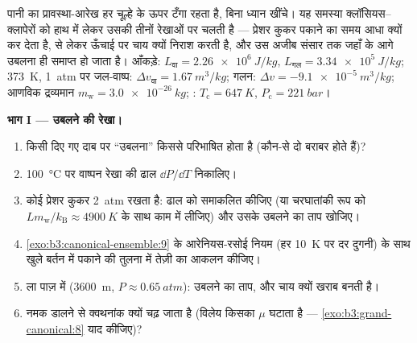 \begin{problem}\label{pb:b3:phase-transitions:1}
पानी का प्रावस्था-आरेख हर चूल्हे के ऊपर टँगा रहता है, बिना ध्यान
खींचे। यह समस्या क्लॉसियस--क्लापेरों को हाथ में लेकर उसकी तीनों
रेखाओं पर चलती है --- प्रेशर कुकर पकाने का समय आधा क्यों कर देता है,
से लेकर ऊँचाई पर चाय क्यों निराश करती है, और उस अजीब संसार तक जहाँ
 के आगे उबलना ही समाप्त हो जाता है। आँकड़े: $L_{\text{वा}}
= \qty{2.26e6}{J/kg}$, $L_{\text{गल}} = \qty{3.34e5}{J/kg}$;
\qty{373}{K}, \qty{1}{atm} पर जल-वाष्प: $\Delta v_{\text{वा}}
= \qty{1.67}{m^3/kg}$; गलन: $\Delta v = \qty{-9.1e-5}{m^3/kg}$;
आणविक द्रव्यमान $m_{\text{w}} = \qty{3.0e-26}{kg}$; :
$T_{\text{c}} = \qty{647}{K}$, $P_{\text{c}} = \qty{221}{bar}$।

\medskip\noindent\textbf{भाग I --- उबलने की रेखा।}
\begin{enumerate}
  \item किसी दिए गए दाब पर ``उबलना'' किससे परिभाषित होता है (कौन-से
        दो  बराबर होते हैं)?
  \item \qty{100}{\celsius} पर वाष्पन रेखा की ढाल $\dd P/\dd T$
        निकालिए।
  \item कोई प्रेशर कुकर \qty{2}{atm} रखता है: ढाल को समाकलित
        कीजिए (या चरघातांकी रूप को $Lm_{\text{w}}/
        k_{\text{B}} \approx \qty{4900}{K}$ के साथ काम में लीजिए)
        और उसके उबलने का ताप खोजिए।
  \item \cref{exo:b3:canonical-ensemble:9} के आरेनियस-रसोई नियम
        (हर \qty{10}{K} पर दर दुगनी) के साथ खुले बर्तन में पकाने
        की तुलना में तेज़ी का आकलन कीजिए।
  \item ला पाज़ में (\qty{3600}{m}, $P \approx \qty{0.65}{atm}$):
        उबलने का ताप, और चाय क्यों खराब बनती है।
  \item नमक डालने से क्वथनांक क्यों चढ़ जाता है (विलेय किसका $\mu$
        घटाता है --- \cref{exo:b3:grand-canonical:8} याद
        कीजिए)?
\end{enumerate}


\end{problem}
